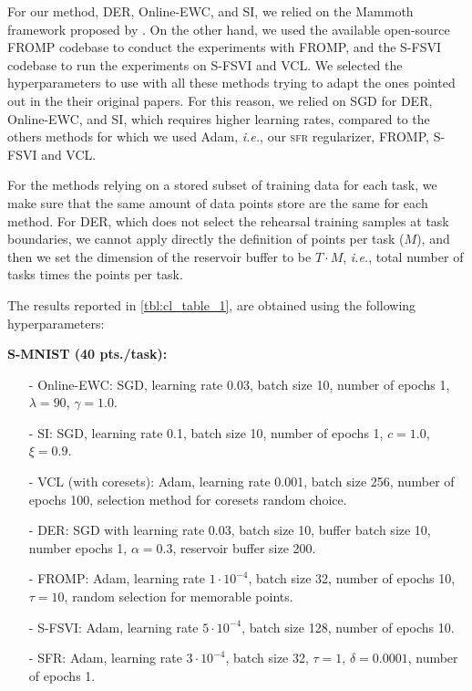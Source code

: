 \documentclass{article}
\makeatletter
\newcommand{\ie}{\textit{i.e.\@}\xspace}
\newcommand{\our}{\textsc{sfr}\xspace}
\makeatother
\begin{document}
For our method, DER, Online-EWC, and SI, we relied on the Mammoth framework proposed by \citep{buzzega2020dark}. On the other hand, we used the available open-source FROMP codebase to conduct the experiments with FROMP, and the S-FSVI codebase to run the experiments on S-FSVI and VCL. We selected the hyperparameters to use with all these methods trying to adapt the ones pointed out in the their original papers. For this reason, we relied on SGD for DER, Online-EWC, and SI, which requires higher learning rates, compared to the others methods for which we used Adam, \ie, our \our regularizer, FROMP, S-FSVI and VCL.

For the methods relying on a stored subset of training data for each task, we make sure that the same amount of data points store are the same for each method. For DER, which does not select the rehearsal training samples at task boundaries, we cannot apply directly the definition of points per task ($M$), and then we set the dimension of the reservoir buffer to be $T \cdot M$, \ie, total number of tasks times the points per task.

The results reported in \cref{tbl:cl_table_1}, are obtained using the following hyperparameters:
 
\textbf{S-MNIST (40 pts./task):}
\begin{itemize}
	\item[-] Online-EWC: SGD, learning rate $0.03$, batch size  10, number of epochs 1, $\lambda=90$, $\gamma=1.0$.
	\item[-] SI: SGD, learning rate 0.1, batch size 10, number of epochs 1, $c=1.0$, $\xi=0.9$.
	\item[-] VCL (with coresets): Adam, learning rate 0.001, batch size 256, number of epochs 100, selection method for coresets random choice.
	\item[-] DER: SGD with learning rate 0.03, batch size 10, buffer batch size 10, number epochs 1, $\alpha=0.3$, reservoir buffer size 200.
	\item[-] FROMP: Adam, learning rate $1 \cdot 10^{-4}$, batch size 32, number of epochs 10, $\tau = 10$, random selection for memorable points.
	\item[-] S-FSVI: Adam, learning rate $5 \cdot 10^{-4}$, batch size 128, number of epochs 10.
	\item[-] SFR: Adam, learning rate $3 \cdot 10^{-4}$, batch size 32, $\tau=1$, $\delta=0.0001$,  number of epochs 1.
\end{itemize}
\end{document}
